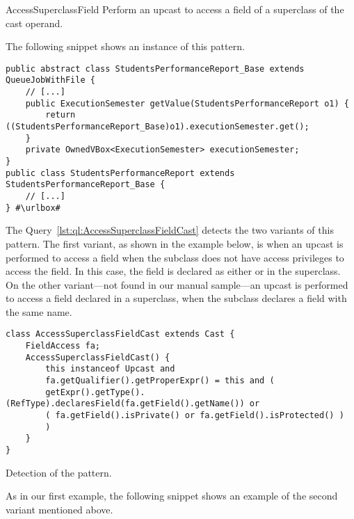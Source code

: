 \begin{pattern}{AccessSuperclassField}
Perform an upcast to access a field of a superclass of the cast operand.

\instances{}
The following snippet shows an instance of this pattern.

\def\urlvar{http://bit.ly/FenixEdu_fenixedu_academic_2SQxlkC}
\begin{verbatim}
public abstract class StudentsPerformanceReport_Base extends QueueJobWithFile {
    // [...]
    public ExecutionSemester getValue(StudentsPerformanceReport o1) {
        return ((StudentsPerformanceReport_Base)o1).executionSemester.get();
    }
    private OwnedVBox<ExecutionSemester> executionSemester;
}
public class StudentsPerformanceReport extends StudentsPerformanceReport_Base {
    // [...]
} #\urlbox#
\end{verbatim}


\detection{}
The Query~\ref{lst:ql:AccessSuperclassFieldCast} detects the two variants of this pattern.
The first variant, as shown in the example below, is when an upcast is performed to access a field when the subclass does not have access privileges to access the field.
In this case, the field is declared as either  or  in the superclass.
On the other variant---not found in our manual sample---an upcast is performed to access a field declared in a superclass,
when the subclass declares a field with the same name.


\begin{listing}
\begin{verbatim}
class AccessSuperclassFieldCast extends Cast {
	FieldAccess fa;
	AccessSuperclassFieldCast() {
		this instanceof Upcast and
		fa.getQualifier().getProperExpr() = this and (
		getExpr().getType().(RefType).declaresField(fa.getField().getName()) or
		( fa.getField().isPrivate() or fa.getField().isProtected() )
		)
	}
}
\end{verbatim}
\caption{Detection of the \thisp{} pattern.}
\label{lst:ql:AccessSuperclassFieldCast}
\end{listing}

As in our first example,
the following snippet shows an example of the second variant mentioned above.


\end{pattern}
